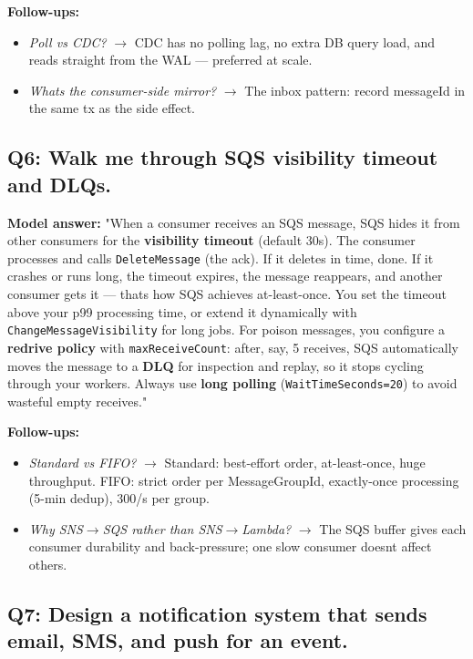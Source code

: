 \documentclass[11pt]{article}
\providecommand{\tightlist}{\setlength{\itemsep}{1pt}\setlength{\parskip}{0pt}}
\begin{document}
\textbf{Follow-ups:}

\begin{itemize}
\tightlist
\item
  \emph{Poll vs CDC?} \(\rightarrow\) CDC has no polling lag, no extra DB query load, and reads straight from the WAL --- preferred at scale.
\item
  \emph{What\textquotesingle s the consumer-side mirror?} \(\rightarrow\) The inbox pattern: record messageId in the same tx as the side effect.
\end{itemize}

\subsection{Q6: Walk me through SQS visibility timeout and DLQs.}\label{q6-walk-me-through-sqs-visibility-timeout-and-dlqs}

\textbf{Model answer:} "When a consumer receives an SQS message, SQS hides it from other consumers for the \textbf{visibility timeout} (default 30s). The consumer processes and calls \texttt{DeleteMessage} (the ack). If it deletes in time, done. If it crashes or runs long, the timeout expires, the message reappears, and another consumer gets it --- that\textquotesingle s how SQS achieves at-least-once. You set the timeout above your p99 processing time, or extend it dynamically with \texttt{ChangeMessageVisibility} for long jobs. For poison messages, you configure a \textbf{redrive policy} with \texttt{maxReceiveCount}: after, say, 5 receives, SQS automatically moves the message to a \textbf{DLQ} for inspection and replay, so it stops cycling through your workers. Always use \textbf{long polling} (\texttt{WaitTimeSeconds=20}) to avoid wasteful empty receives."

\textbf{Follow-ups:}

\begin{itemize}
\tightlist
\item
  \emph{Standard vs FIFO?} \(\rightarrow\) Standard: best-effort order, at-least-once, huge throughput. FIFO: strict order per MessageGroupId, exactly-once processing (5-min dedup), 300/s per group.
\item
  \emph{Why SNS\(\rightarrow\)SQS rather than SNS\(\rightarrow\)Lambda?} \(\rightarrow\) The SQS buffer gives each consumer durability and back-pressure; one slow consumer doesn\textquotesingle t affect others.
\end{itemize}

\subsection{Q7: Design a notification system that sends email, SMS, and push for an event.}\label{q7-design-a-notification-system-that-sends-email-sms-and-push-for-an-event}
\end{document}

